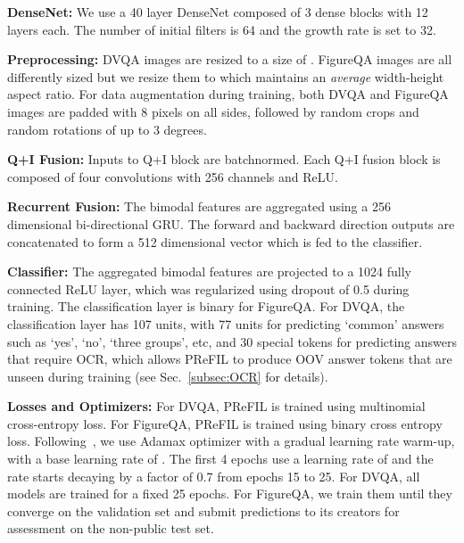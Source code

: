 \documentclass[10pt,twocolumn]{article}
\begin{document}
\textbf{DenseNet:} We use a 40 layer DenseNet composed of 3 dense blocks with 12 layers each. The number of initial filters is 64 and the growth rate is set to 32.

\textbf{Preprocessing:} DVQA images are resized to a size of . FigureQA images are all differently sized but we resize them to  which maintains an \textit{average} width-height aspect ratio. For data augmentation during training, both DVQA and FigureQA images are padded with 8 pixels  on all sides, followed by random crops and random rotations of up to 3 degrees.

\textbf{Q+I Fusion:} Inputs to Q+I block are batchnormed. Each Q+I fusion block is composed of four  convolutions with 256 channels and ReLU. 

\textbf{Recurrent Fusion:} The bimodal features are aggregated using a 256 dimensional bi-directional GRU. The forward and backward direction outputs are concatenated to form a 512 dimensional vector which is fed to the classifier.

\textbf{Classifier:} The aggregated bimodal features are projected to a 1024 fully connected ReLU layer, which was regularized using  dropout of 0.5 during training. The classification layer is binary for FigureQA. For DVQA, the classification layer has 107 units,  with 77 units for predicting `common' answers such as `yes', `no', `three groups', etc, and 30 special tokens for predicting answers that require OCR, which allows PReFIL to produce OOV answer tokens that are unseen during training (see Sec.~\ref{subsec:OCR} for details).

\textbf{Losses and Optimizers:} For DVQA, PReFIL is trained using multinomial cross-entropy loss. For FigureQA, PReFIL is trained using binary cross entropy loss. Following~\cite{kim2018bilinear}, we use Adamax optimizer with a gradual learning rate warm-up, with a base learning rate of . The first 4 epochs use a learning rate of  and the rate starts decaying by a factor of 0.7 from epochs 15 to 25. For DVQA, all models are trained for a fixed 25 epochs. For FigureQA, we train them until they converge on the validation set and submit predictions to its creators for assessment on the non-public test set.
\end{document}
